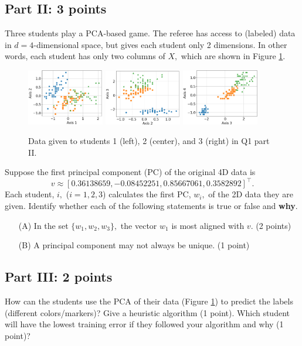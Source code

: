 \documentclass[12pt]{article}
\begin{document}
\subsection*{Part II: 3 points}
Three students play a PCA-based game. The referee has access to (labeled) data in $d = 4$-dimensional space, but gives each student only 2 dimensions. In other words, each student has only two columns of $X,$ which are shown in Figure \ref{fig:pca}.
\begin{figure}[h]
    \centering
    \includegraphics[width=0.3\textwidth]{midterm/pca-1.png}
    \includegraphics[width=0.3\textwidth]{midterm/pca-2.png}
    \includegraphics[width=0.3\textwidth]{midterm/pca-3.png}
    \caption{Data given to students 1 (left), 2 (center), and 3 (right) in Q1 part II.}
    \label{fig:pca}
\end{figure}
Suppose the first principal component (PC) of the original 4D data is $$v \approx [0.36138659, -0.08452251,  0.85667061,  0.3582892]^\top.$$ Each student, $i,$ ($i = 1, 2, 3$) calculates the first PC, $w_i,$ of the 2D data they are given. Identify whether each of the following statements is true or false and {\bf why}.    
    \begin{itemize}
        \item[(A)] In the set $\{w_1, w_2, w_3\},$ the vector $w_1$ is most aligned with $v.$ (2 points)
        \item[(B)] A principal component may not always be unique. (1 point)
    \end{itemize}
\subsection*{Part III: 2 points}
How can the students use the PCA of their data (Figure \ref{fig:pca}) to predict the labels (different colors/markers)? Give a heuristic algorithm (1 point). Which student will have the lowest training error if they followed your algorithm and why (1 point)?
\end{document}
